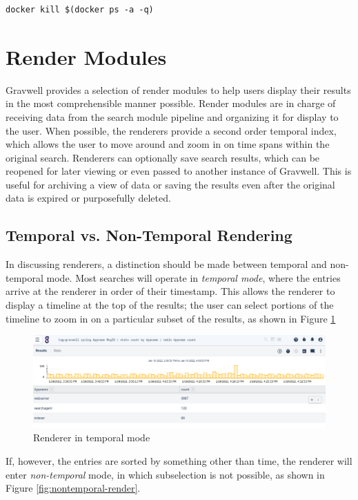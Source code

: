 \begin{Verbatim}[breaklines=true]
docker kill $(docker ps -a -q)
\end{Verbatim}





\clearpage
\section{Render Modules}
Gravwell provides a selection of render modules to help users display
their results in the most comprehensible manner possible. Render modules
are in charge of receiving data from the search module pipeline and
organizing it for display to the user. When possible, the renderers
provide a second order temporal index, which allows the user to move
around and zoom in on time spans within the original search. Renderers
can optionally save search results, which can be reopened for later
viewing or even passed to another instance of Gravwell. This is useful
for archiving a view of data or saving the results even after the
original data is expired or purposefully deleted.

\subsection{Temporal vs. Non-Temporal Rendering}
In discussing renderers, a distinction should be made between temporal
and non-temporal mode. Most searches will operate in \emph{temporal mode},
where the entries arrive at the renderer in order of their
timestamp. This allows the renderer to display a timeline at the top
of the results; the user can select portions of the timeline to zoom in
on a particular subset of the results, as shown in Figure \ref{fig:temporal-render}

\begin{figure}
	\includegraphics[width=0.8\linewidth]{images/temporal-render.png}
	\caption{Renderer in temporal mode}
	\label{fig:temporal-render}
\end{figure}

If, however, the entries are sorted by something other than time, the
renderer will enter \emph{non-temporal} mode, in which subselection is not
possible, as shown in Figure \ref{fig:nontemporal-render}.

